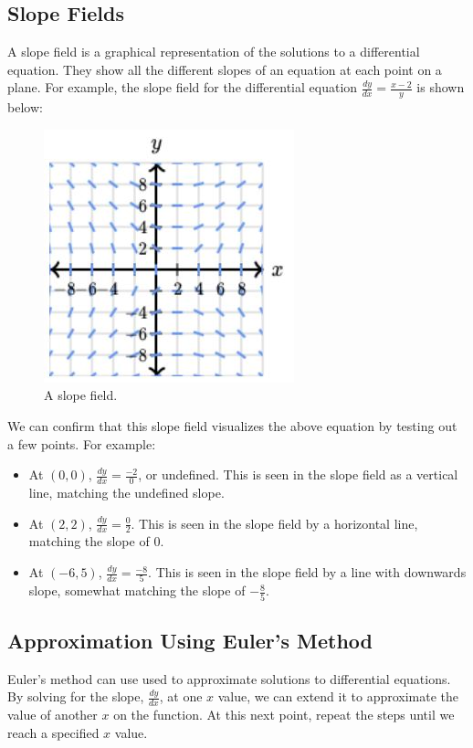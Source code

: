 \documentclass[12pt]{article}
\begin{document}
\subsection{Slope Fields}
A slope field is a graphical representation of the solutions to a differential equation. They show all the different slopes of an equation at each point on a plane. For example, the slope field for the differential equation $\frac{dy}{dx} = \frac{x - 2}{y}$ is shown below:
\begin{figure}[H]
	\centering
	\includegraphics{images/fig13.JPG}
	\caption{A slope field.}
\end{figure}

We can confirm that this slope field visualizes the above equation by testing out a few points. For example:
\begin{itemize}
	\item At $(0, 0)$, $\frac{dy}{dx} = \frac{-2}{0}$, or undefined. This is seen in the slope field as a vertical line, matching the undefined slope.
	\item At $(2, 2)$, $\frac{dy}{dx} = \frac{0}{2}$. This is seen in the slope field by a horizontal line, matching the slope of $0$.
	\item At $(-6, 5)$, $\frac{dy}{dx} = \frac{-8}{5}$. This is seen in the slope field by a line with downwards slope, somewhat matching the slope of $-\frac{8}{5}$.
\end{itemize}

\subsection{Approximation Using Euler's Method}
Euler's method can use used to approximate solutions to differential equations. By solving for the slope, $\frac{dy}{dx}$, at one $x$ value, we can extend it to approximate the value of another $x$ on the function. At this next point, repeat the steps until we reach a specified $x$ value.
\end{document}
